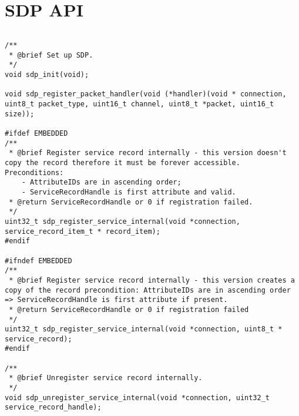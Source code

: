 \section{SDP API}
\label{appendix:api_sdp}
$ $
\begin{lstlisting}
/** 
 * @brief Set up SDP.
 */
void sdp_init(void);

void sdp_register_packet_handler(void (*handler)(void * connection, uint8_t packet_type, uint16_t channel, uint8_t *packet, uint16_t size));

#ifdef EMBEDDED
/** 
 * @brief Register service record internally - this version doesn't copy the record therefore it must be forever accessible. Preconditions:
    - AttributeIDs are in ascending order;
    - ServiceRecordHandle is first attribute and valid.
 * @return ServiceRecordHandle or 0 if registration failed.
 */
uint32_t sdp_register_service_internal(void *connection, service_record_item_t * record_item);
#endif

#ifndef EMBEDDED
/** 
 * @brief Register service record internally - this version creates a copy of the record precondition: AttributeIDs are in ascending order => ServiceRecordHandle is first attribute if present. 
 * @return ServiceRecordHandle or 0 if registration failed
 */
uint32_t sdp_register_service_internal(void *connection, uint8_t * service_record);
#endif

/** 
 * @brief Unregister service record internally.
 */
void sdp_unregister_service_internal(void *connection, uint32_t service_record_handle);
\end{lstlisting}
\pagebreak
